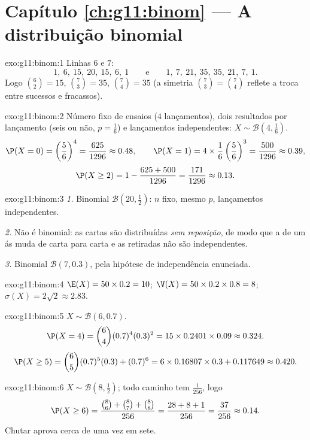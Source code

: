 \section*{Capítulo \ref{ch:g11:binom} --- A distribuição binomial}

\begin{solution}{exo:g11:binom:1}
Linhas $6$ e $7$:
\[
1,\ 6,\ 15,\ 20,\ 15,\ 6,\ 1
\qquad\text{e}\qquad
1,\ 7,\ 21,\ 35,\ 35,\ 21,\ 7,\ 1 .
\]
Logo $\binom62 = 15$, $\binom73 = 35$, $\binom74 = 35$ (a simetria
$\binom73 = \binom74$ reflete a troca entre sucessos e fracassos).
\end{solution}

\begin{solution}{exo:g11:binom:2}
Número fixo de ensaios ($4$ lançamentos), dois resultados por lançamento
(seis ou não, $p = \frac16$) e lançamentos independentes:
$X \sim \mathcal B(4, \frac16)$.
\[
\P(X=0) = \left(\frac56\right)^4 = \frac{625}{1296} \approx 0.48,
\qquad
\P(X=1) = 4 \times \frac16\left(\frac56\right)^3 = \frac{500}{1296}
\approx 0.39,
\]
\[
\P(X \geq 2) = 1 - \frac{625 + 500}{1296} = \frac{171}{1296}
\approx 0.13 .
\]
\end{solution}

\begin{solution}{exo:g11:binom:3}
\emph{1.} Binomial $\mathcal B(20, \frac12)$: $n$ fixo, mesmo $p$,
lançamentos independentes.

\emph{2.} Não é binomial: as cartas são distribuídas \emph{sem
reposição}, de modo que a  de um ás muda de carta para carta
e as retiradas não são independentes.

\emph{3.} Binomial $\mathcal B(7, 0.3)$, pela hipótese de independência
enunciada.
\end{solution}

\begin{solution}{exo:g11:binom:4}
$\E(X) = 50 \times 0.2 = 10$;
$\V(X) = 50 \times 0.2 \times 0.8 = 8$;
$\sigma(X) = 2\sqrt2 \approx 2.83$.
\end{solution}

\begin{solution}{exo:g11:binom:5}
$X \sim \mathcal B(6, 0.7)$.
\[
\P(X = 4) = \binom64 (0.7)^4 (0.3)^2 = 15 \times 0.2401 \times 0.09
\approx 0.324 .
\]
\[
\P(X \geq 5) = \binom65 (0.7)^5(0.3) + (0.7)^6
= 6 \times 0.16807 \times 0.3 + 0.117649 \approx 0.420 .
\]
\end{solution}

\begin{solution}{exo:g11:binom:6}
$X \sim \mathcal B\left(8, \frac12\right)$; todo caminho tem
 $\frac{1}{256}$, logo
\[
\P(X \geq 6) = \frac{\binom86 + \binom87 + \binom88}{256}
= \frac{28 + 8 + 1}{256} = \frac{37}{256} \approx 0.14 .
\]
Chutar aprova cerca de uma vez em sete.
\end{solution}

